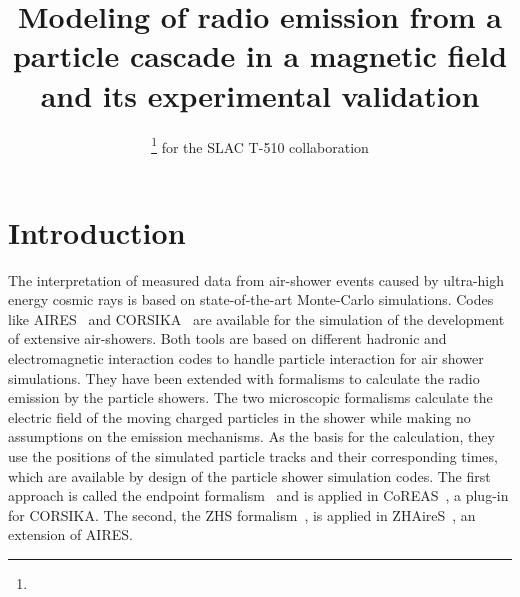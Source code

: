 \documentclass[epj]{webofc}
\begin{document}
%
\title{Modeling of radio emission from a particle cascade in a magnetic field and its experimental validation}
%
%

\author{ \fnsep\thanks{} for the SLAC T-510 collaboration }


%
\maketitle
%
\section{Introduction}
\label{intro}
\vspace{-0.15cm}
The interpretation of measured data from air-shower events caused by ultra-high energy cosmic rays is based on state-of-the-art Monte-Carlo simulations. Codes like AIRES~\cite{AIRES} and CORSIKA~\cite{CORSIKA} are available for the simulation of the development of extensive air-showers. 
%
Both tools are based on different hadronic and electromagnetic interaction codes to handle particle interaction for air shower simulations. They have been extended with formalisms to calculate the radio emission by the particle showers.
The two microscopic formalisms calculate the electric field of the moving charged particles in the shower while making no assumptions on the emission mechanisms.
As the basis for the calculation, they use the positions of the simulated particle tracks and their corresponding times, which are available by design of the particle shower simulation codes.
The first approach is called the endpoint formalism~\cite{Endpoint}\cite{REAS3} and is applied in CoREAS~\cite{CoREAS}, a plug-in for CORSIKA. The second, the ZHS formalism~\cite{ZHS}, is applied in ZHAireS~\cite{ZHAireS}, an extension of AIRES. 
\end{document}

